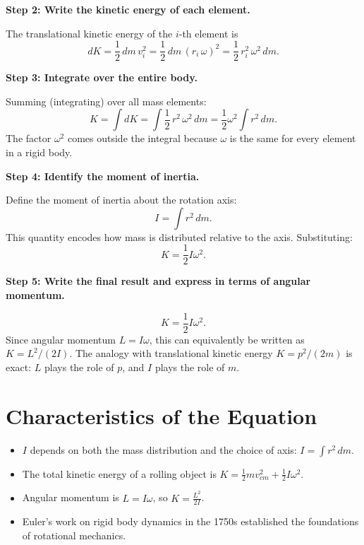 \textbf{Step 2: Write the kinetic energy of each element.}

The translational kinetic energy of the $i$-th element is
\begin{equation}
dK = \frac{1}{2}\,dm\,v_i^2 = \frac{1}{2}\,dm\,(r_i\,\omega)^2 = \frac{1}{2}\,r_i^2\,\omega^2\,dm.
\end{equation}

\textbf{Step 3: Integrate over the entire body.}

Summing (integrating) over all mass elements:
\begin{equation}
K = \int dK = \int \frac{1}{2}\,r^2\,\omega^2\,dm = \frac{1}{2}\omega^2\int r^2\,dm.
\end{equation}
The factor $\omega^2$ comes outside the integral because $\omega$ is the same for every element in a rigid body.

\textbf{Step 4: Identify the moment of inertia.}

Define the moment of inertia about the rotation axis:
\begin{equation}
I = \int r^2\,dm.
\end{equation}
This quantity encodes how mass is distributed relative to the axis. Substituting:
\begin{equation}
K = \frac{1}{2}I\omega^2.
\end{equation}

\textbf{Step 5: Write the final result and express in terms of angular momentum.}

\begin{equation}
\boxed{K = \frac{1}{2}I\omega^2.}
\end{equation}
Since angular momentum $L = I\omega$, this can equivalently be written as $K = L^2/(2I)$. The analogy with translational kinetic energy $K = p^2/(2m)$ is exact: $L$ plays the role of $p$, and $I$ plays the role of $m$.

\section*{Characteristics of the Equation}

\begin{itemize}
    \item $I$ depends on both the mass distribution and the choice of axis: $I = \int r^2\,dm$.
    \item The total kinetic energy of a rolling object is $K = \frac{1}{2}mv_{cm}^2 + \frac{1}{2}I\omega^2$.
    \item Angular momentum is $L = I\omega$, so $K = \frac{L^2}{2I}$.
    \item Euler's work on rigid body dynamics in the 1750s established the foundations of rotational mechanics.
\end{itemize}
